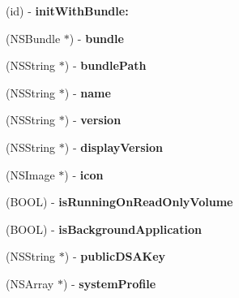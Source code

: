 \begin{DoxyCompactItemize}
\item 
\mbox{\label{interface_s_u_host_a9f6c913447da27af4cf76f682437cfce}} 
(id) -\/ {\bfseries init\+With\+Bundle\+:}
\item 
\mbox{\label{interface_s_u_host_a12cb5fede329097d09dc96bfa6091e8f}} 
(N\+S\+Bundle $\ast$) -\/ {\bfseries bundle}
\item 
\mbox{\label{interface_s_u_host_ac6093a778d02119550a7ea04d3d3f9b5}} 
(N\+S\+String $\ast$) -\/ {\bfseries bundle\+Path}
\item 
\mbox{\label{interface_s_u_host_a58f20de3a165846f34f09010b9e82eca}} 
(N\+S\+String $\ast$) -\/ {\bfseries name}
\item 
\mbox{\label{interface_s_u_host_a634ec9897a52a1b4bd20c47c2c67715c}} 
(N\+S\+String $\ast$) -\/ {\bfseries version}
\item 
\mbox{\label{interface_s_u_host_a3d9ac95e9fb93893397e3a09d8ea9da7}} 
(N\+S\+String $\ast$) -\/ {\bfseries display\+Version}
\item 
\mbox{\label{interface_s_u_host_a84ba057e8eedb0b8fab43f86128364c9}} 
(N\+S\+Image $\ast$) -\/ {\bfseries icon}
\item 
\mbox{\label{interface_s_u_host_aba6e59696dbd9bbc6d9d3865ced5bedd}} 
(B\+O\+OL) -\/ {\bfseries is\+Running\+On\+Read\+Only\+Volume}
\item 
\mbox{\label{interface_s_u_host_ac3ec1d8ef701b093c2399e9489c61fb6}} 
(B\+O\+OL) -\/ {\bfseries is\+Background\+Application}
\item 
\mbox{\label{interface_s_u_host_a6600c37291611abbab47559259cfcfd5}} 
(N\+S\+String $\ast$) -\/ {\bfseries public\+D\+S\+A\+Key}
\item 
\mbox{\label{interface_s_u_host_a6f943da587af5de4c1f8d24d23fc8e9c}} 
(N\+S\+Array $\ast$) -\/ {\bfseries system\+Profile}

\end{DoxyCompactItemize}
